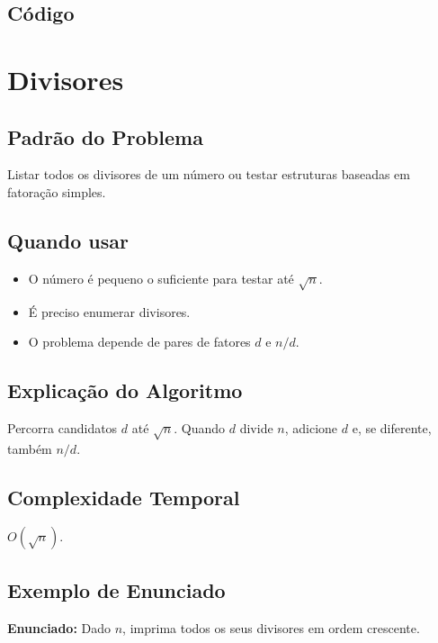 \subsection{Código}

\section{Divisores}

\subsection{Padrão do Problema}
Listar todos os divisores de um número ou testar estruturas baseadas em fatoração simples.

\subsection{Quando usar}
\begin{itemize}[nosep]
  \item O número é pequeno o suficiente para testar até $\sqrt n$.
  \item É preciso enumerar divisores.
  \item O problema depende de pares de fatores $d$ e $n/d$.
\end{itemize}

\subsection{Explicação do Algoritmo}
Percorra candidatos $d$ até $\sqrt n$. Quando $d$ divide $n$, adicione $d$ e, se diferente, também $n/d$.

\subsection{Complexidade Temporal}
$O(\sqrt n)$.

\subsection{Exemplo de Enunciado}
\begin{exemplodiabox}
\textbf{Enunciado:} Dado $n$, imprima todos os seus divisores em ordem crescente.
\end{exemplodiabox}

